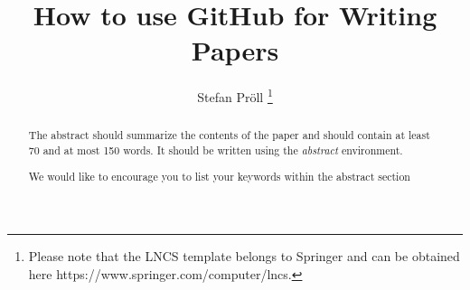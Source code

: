 \documentclass[runningheads,a4paper]{template/llncs}
\newcommand{\keywords}[1]{\par\addvspace\baselineskip
\noindent\keywordname\enspace\ignorespaces#1}
\begin{document}
\mainmatter  %

\title{How to use GitHub for Writing Papers}


%
%
\author{Stefan Pr\"{o}ll%
\thanks{Please note that the LNCS template belongs to Springer and can be obtained here https://www.springer.com/computer/lncs.}%
}
%


%
%

\maketitle


\begin{abstract}
The abstract should summarize the contents of the paper and should
contain at least 70 and at most 150 words. It should be written using the
\emph{abstract} environment.
\keywords{We would like to encourage you to list your keywords within
the abstract section}
\end{abstract}






\vfill



\end{document}
